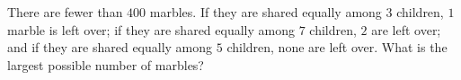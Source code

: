 There are fewer than $400$ marbles. If they are shared equally among $3$ children, $1$ marble is left over; if they are shared equally among $7$ children, $2$ are left over; and if they are shared equally among $5$ children, none are left over. What is the largest possible number of marbles?
